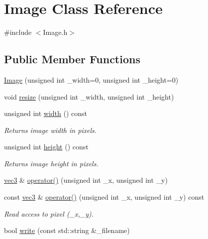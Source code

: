 \hypertarget{classImage}{}\section{Image Class Reference}
\label{classImage}


{\ttfamily \#include $<$Image.\+h$>$}

\subsection*{Public Member Functions}
\begin{DoxyCompactItemize}
\item 
\hyperlink{classImage_abe454624b0ed2ecbe6f2bffe76379911}{Image} (unsigned int \+\_\+width=0, unsigned int \+\_\+height=0)
\item 
void \hyperlink{classImage_a5692baf9c0f1b389db0cf4f344d585e6}{resize} (unsigned int \+\_\+width, unsigned int \+\_\+height)
\item 
unsigned int \hyperlink{classImage_a622448e6a454614d431d5cee77b0a7f2}{width} () const 
\begin{DoxyCompactList}\small\item\em Returns image width in pixels. \end{DoxyCompactList}\item 
unsigned int \hyperlink{classImage_a755dc7553e45feee69c1c3e208c260ba}{height} () const 
\begin{DoxyCompactList}\small\item\em Returns image height in pixels. \end{DoxyCompactList}\item 
\hyperlink{classvec3}{vec3} \& \hyperlink{classImage_aaea1be59965e893cd4e66f0a66b5b29c}{operator()} (unsigned int \+\_\+x, unsigned int \+\_\+y)
\item 
const \hyperlink{classvec3}{vec3} \& \hyperlink{classImage_a6d432ff46ea92a5df6e047eb6a4955be}{operator()} (unsigned int \+\_\+x, unsigned int \+\_\+y) const 
\begin{DoxyCompactList}\small\item\em Read access to pixel (\+\_\+x,\+\_\+y). \end{DoxyCompactList}\item 
bool \hyperlink{classImage_a20c73b1670af26168c75e31e8794769d}{write} (const std\+::string \&\+\_\+filename)
\end{DoxyCompactItemize}

